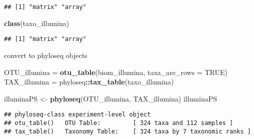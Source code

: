 \documentclass[
]{article}
\newenvironment{Shaded}{\begin{snugshade}}{\end{snugshade}}
\newcommand{\AttributeTok}[1]{\textcolor[rgb]{0.13,0.29,0.53}{#1}}
\newcommand{\ConstantTok}[1]{\textcolor[rgb]{0.56,0.35,0.01}{#1}}
\newcommand{\FunctionTok}[1]{\textcolor[rgb]{0.13,0.29,0.53}{\textbf{#1}}}
\newcommand{\NormalTok}[1]{#1}
\newcommand{\OtherTok}[1]{\textcolor[rgb]{0.56,0.35,0.01}{#1}}
\newcommand{\SpecialCharTok}[1]{\textcolor[rgb]{0.81,0.36,0.00}{\textbf{#1}}}
\begin{document}
\begin{verbatim}
## [1] "matrix" "array"
\end{verbatim}

\begin{Shaded}
\begin{Highlighting}[]
\FunctionTok{class}\NormalTok{(taxo\_illumina) }
\end{Highlighting}
\end{Shaded}

\begin{verbatim}
## [1] "matrix" "array"
\end{verbatim}

convert to phyloseq objects

\begin{Shaded}
\begin{Highlighting}[]
\NormalTok{OTU\_illumina }\OtherTok{=} \FunctionTok{otu\_table}\NormalTok{(biom\_illumina, }\AttributeTok{taxa\_are\_rows =} \ConstantTok{TRUE}\NormalTok{)}
\NormalTok{TAX\_illumina }\OtherTok{=}\NormalTok{ phyloseq}\SpecialCharTok{::}\FunctionTok{tax\_table}\NormalTok{(taxo\_illumina)}

\NormalTok{illuminaPS }\OtherTok{\textless{}{-}} \FunctionTok{phyloseq}\NormalTok{(OTU\_illumina, TAX\_illumina)}
\NormalTok{illuminaPS}
\end{Highlighting}
\end{Shaded}

\begin{verbatim}
## phyloseq-class experiment-level object
## otu_table()   OTU Table:         [ 324 taxa and 112 samples ]
## tax_table()   Taxonomy Table:    [ 324 taxa by 7 taxonomic ranks ]
\end{verbatim}
\end{document}
